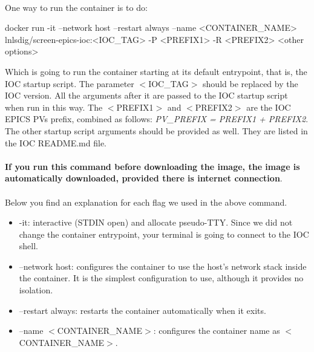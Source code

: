 \documentclass[openany]{article}
\begin{document}
        \paragraph{} One way to run the container is to do:

        \vspace{1mm}
        \begin{code}
docker run -it --network host --restart always --name <CONTAINER_NAME> lnlsdig/screen-epics-ioc:<IOC_TAG> -P <PREFIX1> -R <PREFIX2> <other options>
        \end{code}
        \vspace{1mm}

        Which is going to run the container starting at its default entrypoint, that is, the IOC startup script. The parameter $<$IOC\_TAG$>$ should be replaced by the IOC version. All the arguments after it are passed to the IOC startup script when run in this way. The $<$PREFIX1$>$ and $<$PREFIX2$>$ are the IOC EPICS PVs prefix, combined as follows: \emph{PV\_PREFIX = PREFIX1 + PREFIX2}. The other startup script arguments should be provided as well. They are listed in the IOC README.md file.

        \paragraph{} \textbf{If you run this command before downloading the image, the image is automatically downloaded, provided there is internet connection}.

        \paragraph{} Below you find an explanation for each flag we used in the above command.

        \begin{itemize}
          \item -it: interactive (STDIN open) and allocate pseudo-TTY. Since we did not change the container entrypoint, your terminal is going to connect to the IOC shell.
          \item --network host: configures the container to use the host's network stack inside the container. It is the simplest configuration to use, although it provides no isolation.
          \item --restart always: restarts the container automatically when it exits.
          \item --name $<$CONTAINER\_NAME$>$: configures the container name as $<$CONTAINER\_NAME$>$.
        \end{itemize}
\end{document}
